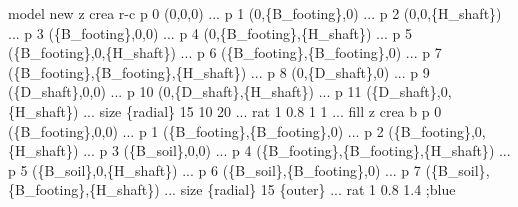 \documentclass[a4paper, nobind]{templates/ociamthesis}
\newenvironment{Shaded}{\begin{snugshade}}{\end{snugshade}}
\newcommand{\SpecialCharTok}[1]{\textcolor[rgb]{0.00,0.00,0.00}{#1}}
\newcommand{\StringTok}[1]{\textcolor[rgb]{0.31,0.60,0.02}{#1}}
\renewenvironment{Shaded}
{
  \vspace{10pt}%
  \begin{snugshade}%
}{%
  \end{snugshade}%
  \vspace{8pt}%
}
\begin{document}
\begin{Shaded}
\begin{Highlighting}[]
\StringTok{model new}
\StringTok{z crea r{-}c p 0 (0,0,0) ...}
\StringTok{           p 1 (0,}\SpecialCharTok{\{B\_footing\}}\StringTok{,0) ...}
\StringTok{           p 2 (0,0,}\SpecialCharTok{\{H\_shaft\}}\StringTok{) ...}
\StringTok{           p 3 (}\SpecialCharTok{\{B\_footing\}}\StringTok{,0,0) ...}
\StringTok{           p 4 (0,}\SpecialCharTok{\{B\_footing\}}\StringTok{,}\SpecialCharTok{\{H\_shaft\}}\StringTok{) ...}
\StringTok{           p 5 (}\SpecialCharTok{\{B\_footing\}}\StringTok{,0,}\SpecialCharTok{\{H\_shaft\}}\StringTok{) ...}
\StringTok{           p 6 (}\SpecialCharTok{\{B\_footing\}}\StringTok{,}\SpecialCharTok{\{B\_footing\}}\StringTok{,0) ...}
\StringTok{           p 7 (}\SpecialCharTok{\{B\_footing\}}\StringTok{,}\SpecialCharTok{\{B\_footing\}}\StringTok{,}\SpecialCharTok{\{H\_shaft\}}\StringTok{) ...}
\StringTok{           p 8 (0,}\SpecialCharTok{\{D\_shaft\}}\StringTok{,0) ...}
\StringTok{           p 9 (}\SpecialCharTok{\{D\_shaft\}}\StringTok{,0,0) ...}
\StringTok{           p 10 (0,}\SpecialCharTok{\{D\_shaft\}}\StringTok{,}\SpecialCharTok{\{H\_shaft\}}\StringTok{) ...}
\StringTok{           p 11 (}\SpecialCharTok{\{D\_shaft\}}\StringTok{,0,}\SpecialCharTok{\{H\_shaft\}}\StringTok{) ...}
\StringTok{           size }\SpecialCharTok{\{radial\}}\StringTok{ 15 10 20 ...}
\StringTok{           rat 1 0.8 1 1 ...}
\StringTok{           fill}
\StringTok{           }
\StringTok{z crea b p 0 (}\SpecialCharTok{\{B\_footing\}}\StringTok{,0,0) ...}
\StringTok{         p 1 (}\SpecialCharTok{\{B\_footing\}}\StringTok{,}\SpecialCharTok{\{B\_footing\}}\StringTok{,0) ...}
\StringTok{         p 2 (}\SpecialCharTok{\{B\_footing\}}\StringTok{,0,}\SpecialCharTok{\{H\_shaft\}}\StringTok{) ...}
\StringTok{         p 3 (}\SpecialCharTok{\{B\_soil\}}\StringTok{,0,0) ...}
\StringTok{         p 4 (}\SpecialCharTok{\{B\_footing\}}\StringTok{,}\SpecialCharTok{\{B\_footing\}}\StringTok{,}\SpecialCharTok{\{H\_shaft\}}\StringTok{) ...}
\StringTok{         p 5 (}\SpecialCharTok{\{B\_soil\}}\StringTok{,0,}\SpecialCharTok{\{H\_shaft\}}\StringTok{) ...}
\StringTok{         p 6 (}\SpecialCharTok{\{B\_soil\}}\StringTok{,}\SpecialCharTok{\{B\_footing\}}\StringTok{,0) ...}
\StringTok{         p 7 (}\SpecialCharTok{\{B\_soil\}}\StringTok{,}\SpecialCharTok{\{B\_footing\}}\StringTok{,}\SpecialCharTok{\{H\_shaft\}}\StringTok{) ...}
\StringTok{         size }\SpecialCharTok{\{radial\}}\StringTok{ 15 }\SpecialCharTok{\{outer\}}\StringTok{ ...}
\StringTok{         rat 1 0.8 1.4 ;blue}


\end{Highlighting}
\end{Shaded}
\end{document}
